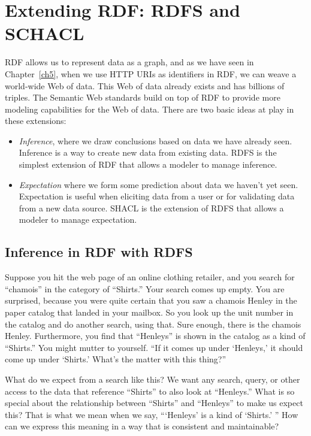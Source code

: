 \chapter{Extending RDF: RDFS and SCHACL}
\label{ch7}

RDF allows us to represent data as a graph, and as we have seen in Chapter~\ref{ch5}, when we use HTTP URIs as 
identifiers in RDF, we can weave a world-wide Web of data.  This Web of data already exists and has billions
of triples. The Semantic Web standards build on top of RDF to provide more modeling capabilities for the
Web of data.  There are two basic ideas at play in these extensions:

\begin{itemize}
    \item \emph{Inference}, where we draw conclusions based on data we have already seen.  Inference is
    a way to create new data from existing data.  RDFS is the simplest extension of RDF that allows a modeler
    to manage inference. 
    \item \emph{Expectation} where we form some prediction about data we haven't yet seen.  Expectation is useful when 
    eliciting data from a user or for validating data from a new data source.  SHACL is the extension of 
    RDFS that allows a modeler to manage expectation. 
\end{itemize}

\section{Inference in RDF with RDFS}



Suppose you hit the web page of an online clothing retailer, and you
search for ``chamois'' in the category of ``Shirts.'' Your search comes
up empty. You are surprised, because you were quite certain that you saw
a chamois Henley in the paper catalog that landed in your mailbox. So
you look up the unit number in the catalog and do another search, using
that. Sure enough, there is the chamois Henley. Furthermore, you find
that ``Henleys'' is shown in the catalog as a kind of ``Shirts.'' You might
mutter to yourself. ``If it comes up under `Henleys,' it should come up
under `Shirts.' What's the matter with this thing?''

What do we expect from a search like this? We want any search, query, or
other access to the data that reference ``Shirts'' to also look at
``Henleys.'' What is so special about the relationship between
``Shirts'' and ``Henleys'' to make us expect this? That is what we mean
when we say, ```Henleys' is a kind of `Shirts.' '' How can we express
this meaning in a way that is consistent and maintainable?

